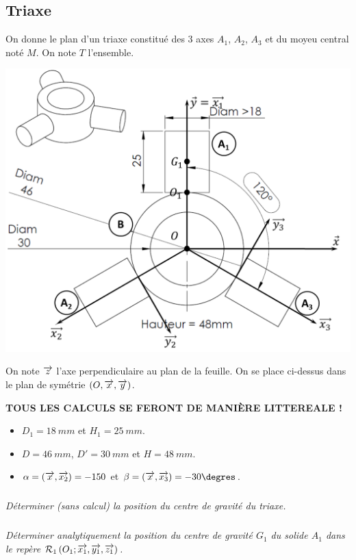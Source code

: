 \documentclass[10pt,fleqn]{article} %
\begin{document}
\begin{multicols}{2}
\section*{Triaxe}
\setcounter{exo}{0}
On donne le plan d'un triaxe constitué des 3 axes $A_1$, $A_2$, $A_3$ et du moyeu central noté $M$. On note  $T$ l'ensemble.

\begin{center}
\includegraphics[width=\linewidth]{images/triaxe.png}
\end{center}
On note $\overrightarrow{z}$ l'axe perpendiculaire au plan de la feuille. On se place ci-dessus dans le plan de symétrie $\left(O,\overrightarrow{x},\overrightarrow{y}\right)$.


\textbf{TOUS LES CALCULS SE FERONT DE MANIÈRE LITTEREALE !}
\begin{itemize}
\item $D_1=\SI{18}{mm}$ et $H_1=\SI{25}{mm}$.
\item $D=\SI{46}{mm}$, $D'=\SI{30}{mm}$ et $H=\SI{48}{mm}$.
\item $\alpha=\left(\overrightarrow{x},\overrightarrow{x_2}\right)=-150$ et 
$\beta=\angl{x}{x_3}=-30\degres$.
\end{itemize}

\subparagraph{}
\textit{Déterminer (sans calcul) la position du centre de gravité du triaxe. }
\ifprof
\begin{corrige}
\end{corrige}
\else
\fi



\subparagraph{}
\textit{Déterminer analytiquement la position du centre de gravité $G_1$ du solide $A_1$ dans le repère $\mathcal{R}_{1}\left(O_1;\overrightarrow{x_1},\overrightarrow{y_1},\overrightarrow{z_1} \right)$.}
\ifprof
\begin{corrige}
\end{corrige}
\else
\fi



\end{multicols}
\end{document}
